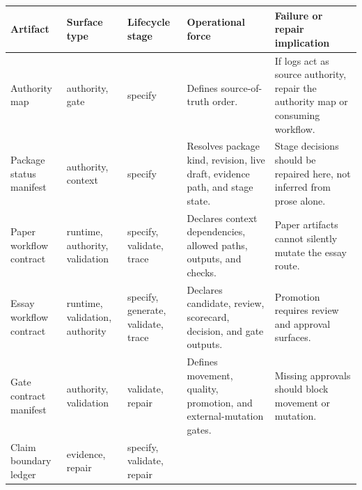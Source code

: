 \documentclass[
]{article}
\begin{document}
\begin{longtable}[]{@{}
  >{\raggedright\arraybackslash}p{}
  >{\raggedright\arraybackslash}p{}
  >{\raggedright\arraybackslash}p{}
  >{\raggedright\arraybackslash}p{}
  >{\raggedright\arraybackslash}p{}@{}}
\toprule\noalign{}
\begin{minipage}[b]{\linewidth}\raggedright
Artifact
\end{minipage} & \begin{minipage}[b]{\linewidth}\raggedright
Surface type
\end{minipage} & \begin{minipage}[b]{\linewidth}\raggedright
Lifecycle stage
\end{minipage} & \begin{minipage}[b]{\linewidth}\raggedright
Operational force
\end{minipage} & \begin{minipage}[b]{\linewidth}\raggedright
Failure or repair implication
\end{minipage} \\
\midrule\noalign{}
\endhead
\bottomrule\noalign{}
\endlastfoot
Authority map & authority, gate & specify & Defines source-of-truth
order. & If logs act as source authority, repair the authority map or
consuming workflow. \\
Package status manifest & authority, context & specify & Resolves
package kind, revision, live draft, evidence path, and stage state. &
Stage decisions should be repaired here, not inferred from prose
alone. \\
Paper workflow contract & runtime, authority, validation & specify,
validate, trace & Declares context dependencies, allowed paths, outputs,
and checks. & Paper artifacts cannot silently mutate the essay route. \\
Essay workflow contract & runtime, validation, authority & specify,
generate, validate, trace & Declares candidate, review, scorecard,
decision, and gate outputs. & Promotion requires review and approval
surfaces. \\
Gate contract manifest & authority, validation & validate, repair &
Defines movement, quality, promotion, and external-mutation gates. &
Missing approvals should block movement or mutation. \\
Claim boundary ledger & evidence, repair & specify, validate, repair &

\end{longtable}
\end{document}
